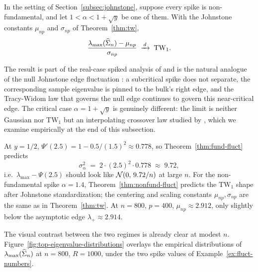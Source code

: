 \begin{theorem}\label{thm:nonfund-fluct}
In the setting of Section~\ref{subsec:johnstone}, suppose every spike is non-fundamental, and let \(1 < \alpha < 1 + \sqrt{y}\) be one of them. With the Johnstone constants \(\mu_{n p}\) and \(\sigma_{n p}\) of Theorem~\ref{thm:tw},
\begin{equation}
  \frac{\lambda_{\max}(\widehat{\Sigma}_n) - \mu_{n p}}{\sigma_{n p}} \;\xrightarrow{\,d\,}\; \mathrm{TW}_1.
\end{equation}
\end{theorem}

The result is part of the real-case spiked analysis of \citet[][Thm.~1.6]{FeralPeche2009} and is the natural analogue of the null Johnstone edge fluctuation \citep{Johnstone2001}: a subcritical spike does not separate, the corresponding sample eigenvalue is pinned to the bulk's right edge, and the Tracy-Widom law that governs the null edge continues to govern this near-critical edge. The critical case \(\alpha = 1 + \sqrt{y}\) is genuinely different: the limit is neither Gaussian nor \(\mathrm{TW}_1\) but an interpolating crossover law studied by \citet{BaikBenArousPeche2005}, which we examine empirically at the end of this subsection.

\begin{example}[Numerical predictions at \(y = 1/2\)]\label{ex:fluct-numbers}
At \(y = 1/2\), \(\Psi'(2.5) = 1 - 0.5/(1.5)^2 \approx 0.778\), so Theorem~\ref{thm:fund-fluct} predicts
\[
  \sigma_\alpha^2 \;=\; 2 \cdot (2.5)^2 \cdot 0.778 \;\approx\; 9.72,
\]
i.e.\ \(\lambda_{\max} - \Psi(2.5)\) should look like \(\mathcal{N}(0,\, 9.72/n)\) at large \(n\). For the non-fundamental spike \(\alpha = 1.4\), Theorem~\ref{thm:nonfund-fluct} predicts the \(\mathrm{TW}_1\) shape after Johnstone standardization; the centering and scaling constants \(\mu_{n p}, \sigma_{n p}\) are the same as in Theorem~\ref{thm:tw}. At \(n = 800\), \(p = 400\), \(\mu_{n p} \approx 2.912\), only slightly below the asymptotic edge \(\lambda_+ \approx 2.914\).
\end{example}

The visual contrast between the two regimes is already clear at modest \(n\). Figure~\ref{fig:top-eigenvalue-distributions} overlays the empirical distributions of \(\lambda_{\max}(\widehat{\Sigma}_n)\) at \(n = 800\), \(R = 1000\), under the two spike values of Example~\ref{ex:fluct-numbers}.


